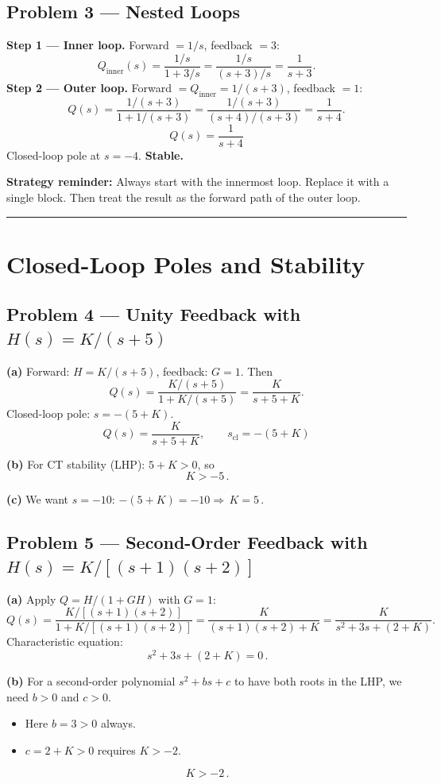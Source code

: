 \documentclass[11pt]{article}
\newcommand{\boxedeq}[1]{\boxed{\,#1\,}}
\begin{document}
\subsection*{Problem 3 --- Nested Loops}

\textbf{Step 1 --- Inner loop.} Forward $=1/s$, feedback $=3$:
\[
Q_{\text{inner}}(s) = \frac{1/s}{1+3/s} = \frac{1/s}{(s+3)/s} = \frac{1}{s+3}.
\]
\textbf{Step 2 --- Outer loop.} Forward $=Q_{\text{inner}}=1/(s+3)$, feedback $=1$:
\[
Q(s) = \frac{1/(s+3)}{1+1/(s+3)} = \frac{1/(s+3)}{(s+4)/(s+3)} = \frac{1}{s+4}.
\]
\[
\boxedeq{Q(s) = \frac{1}{s+4}}
\]
Closed-loop pole at $s=-4$. \textbf{Stable.}

\textbf{Strategy reminder:} Always start with the innermost loop. Replace it with a single block.
Then treat the result as the forward path of the outer loop.

\bigskip\hrule\bigskip

\section*{Closed-Loop Poles and Stability}

\subsection*{Problem 4 --- Unity Feedback with $H(s)=K/(s+5)$}

\textbf{(a)} Forward: $H=K/(s+5)$, feedback: $G=1$. Then
\[
Q(s) = \frac{K/(s+5)}{1+K/(s+5)} = \frac{K}{s+5+K}.
\]
Closed-loop pole: $s = -(5+K)$.
\[
\boxedeq{Q(s) = \frac{K}{s+5+K}, \qquad s_{\text{cl}} = -(5+K)}
\]

\textbf{(b)} For CT stability (LHP): $5+K>0$, so
\[
\boxedeq{K>-5}.
\]

\textbf{(c)} We want $s=-10$: $-(5+K)=-10 \Longrightarrow \boxedeq{K=5}$.

\subsection*{Problem 5 --- Second-Order Feedback with $H(s)=K/[(s+1)(s+2)]$}

\textbf{(a)} Apply $Q=H/(1+GH)$ with $G=1$:
\[
Q(s) = \frac{K/[(s+1)(s+2)]}{1+K/[(s+1)(s+2)]} = \frac{K}{(s+1)(s+2)+K} = \frac{K}{s^2+3s+(2+K)}.
\]
Characteristic equation:
\[
\boxedeq{s^2 + 3s + (2+K) = 0}.
\]

\textbf{(b)} For a second-order polynomial $s^2+bs+c$ to have both roots in the LHP, we need $b>0$ and $c>0$.
\begin{itemize}[nosep]
  \item Here $b=3>0$ always.
  \item $c=2+K>0$ requires $K>-2$.
\end{itemize}
\[
\boxedeq{K>-2}.
\]
\end{document}
